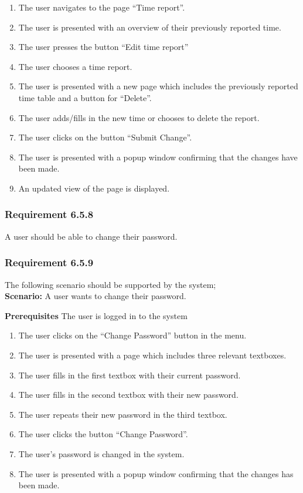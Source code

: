 \documentclass{article}
\begin{document}
\begin{enumerate}

\item The user navigates to the page “Time report”.
\item The user is presented with an overview of their previously reported time. 
\item The user presses the button “Edit time report”
\item The user chooses a time report.
\item The user is presented with a new page which includes the previously reported time table and a button for “Delete”. 
\item The user adds/fills in the new time or chooses to delete the report.
\item The user clicks on the button “Submit Change”.
\item The user is presented with a popup window confirming that the changes have been made.  
\item An updated view of the page is displayed.

\end{enumerate}
\subsubsection{Requirement 6.5.8}
A user should be able to change their password.

\subsubsection{Requirement 6.5.9}
The following scenario should be supported by the system;\\

\textbf{Scenario:} A user wants to change their password.

\textbf{Prerequisites} The user is logged in to the system

\begin{enumerate}
    \item The user clicks on the “Change Password” button in the menu.
    \item The user is presented with a page which includes three relevant textboxes.
    \item The user fills in the first textbox with their current password.
    \item The user fills in the second textbox with their new password.
    \item The user repeats their new password in the third textbox.
    \item The user clicks the button “Change Password”.
    \item The user's password is changed in the system.
    \item The user is presented with a popup window confirming that the changes has been made.
\end{enumerate}
\end{document}
